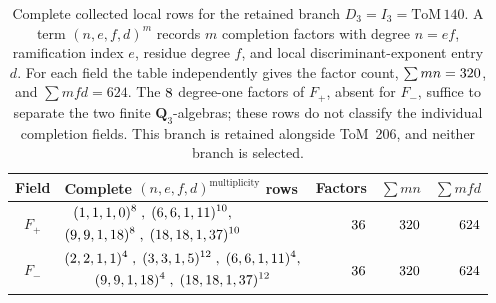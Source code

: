 \begin{table}[t]
  \centering
  \begingroup
  \small
  \setlength{\tabcolsep}{4pt}
  \renewcommand{\arraystretch}{1.16}
  \caption{Complete collected local rows for the retained branch
  \(D_3=I_3=\mathrm{ToM}\,140\).  A term \((n,e,f,d)^m\) records \(m\)
  completion factors with degree \(n=ef\), ramification index \(e\), residue
  degree \(f\), and local discriminant-exponent entry \(d\).  For each field the table
  independently gives the factor count, \(\sum mn=320\), and
  \(\sum mfd=624\).  The \(8\) degree-one factors of
  \(F_+\), absent for \(F_-\), suffice to separate the two finite
  \(\mathbf Q_3\)-algebras; these rows do not classify the individual completion
  fields.  This branch is retained alongside ToM~206, and neither branch is
  selected.}
  \label{tab:c59-local-tom140}
  \begin{tabularx}{\textwidth}{@{}c >{\centering\arraybackslash}X rrr@{}}
    \toprule
    Field & Complete \((n,e,f,d)^{\mathrm{multiplicity}}\) rows
      & Factors & \(\sum mn\) & \(\sum mfd\) \\
    \midrule
    \(F_+\) & \(\CFTTomOneFortyPlusRows\)
      & \(36\)
      & \(320\)
      & \(624\) \\
    \(F_-\) & \(\CFTTomOneFortyMinusRows\)
      & \(36\)
      & \(320\)
      & \(624\) \\
    \bottomrule
  \end{tabularx}
  \endgroup
\end{table}
